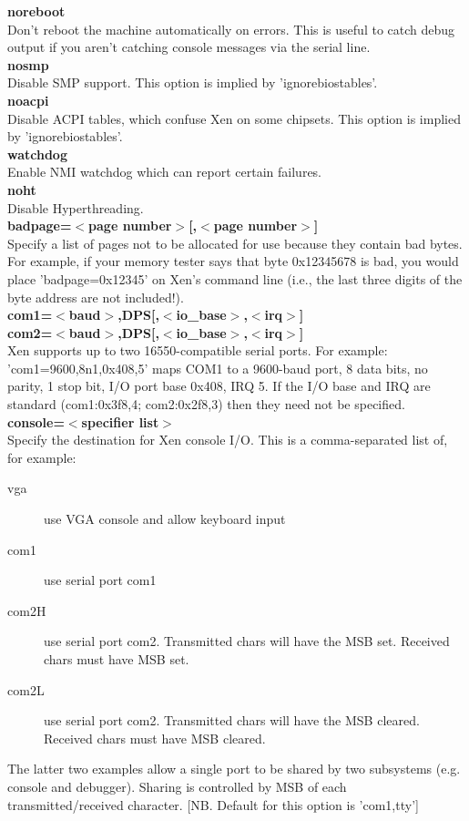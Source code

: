 \documentclass[11pt,twoside,final,openright]{xenstyle}
\begin{document}
{{\bf noreboot } \\
 Don't reboot the machine automatically on errors.  This is
 useful to catch debug output if you aren't catching console messages
 via the serial line. \\

{\bf nosmp } \\
 Disable SMP support.
 This option is implied by 'ignorebiostables'. \\

{\bf noacpi } \\
 Disable ACPI tables, which confuse Xen on some chipsets.
 This option is implied by 'ignorebiostables'. \\

{\bf watchdog } \\
 Enable NMI watchdog which can report certain failures. \\

{\bf noht } \\
 Disable Hyperthreading. \\

{\bf badpage=$<$page number$>$[,$<$page number$>$] } \\
 Specify a list of pages not to be allocated for use 
 because they contain bad bytes. For example, if your
 memory tester says that byte 0x12345678 is bad, you would
 place 'badpage=0x12345' on Xen's command line (i.e., the
 last three digits of the byte address are not
 included!). \\

{\bf com1=$<$baud$>$,DPS[,$<$io\_base$>$,$<$irq$>$] \\
 com2=$<$baud$>$,DPS[,$<$io\_base$>$,$<$irq$>$] } \\
 Xen supports up to two 16550-compatible serial ports.
 For example: 'com1=9600,8n1,0x408,5' maps COM1 to a
 9600-baud port, 8 data bits, no parity, 1 stop bit,
 I/O port base 0x408, IRQ 5.
 If the I/O base and IRQ are standard (com1:0x3f8,4;
 com2:0x2f8,3) then they need not be specified. \\

{\bf console=$<$specifier list$>$ } \\
 Specify the destination for Xen console I/O.
 This is a comma-separated list of, for example:
\begin{description}
 \item[vga]  use VGA console and allow keyboard input
 \item[com1] use serial port com1
 \item[com2H] use serial port com2. Transmitted chars will
   have the MSB set. Received chars must have
   MSB set.
 \item[com2L] use serial port com2. Transmitted chars will
   have the MSB cleared. Received chars must
   have MSB cleared.
\end{description}
 The latter two examples allow a single port to be
 shared by two subsystems (e.g. console and
 debugger). Sharing is controlled by MSB of each
 transmitted/received character.
 [NB. Default for this option is 'com1,tty'] \\

}
\end{document}
